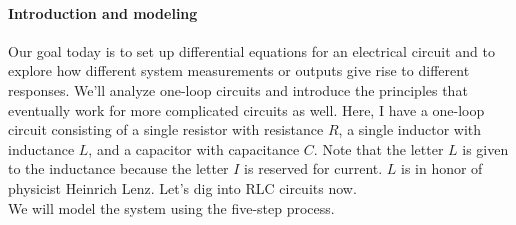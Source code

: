 \paragraph{Introduction and modeling}
Our goal today is to set up differential equations
for an electrical circuit and to explore how different system
measurements or outputs give rise to different responses.
We'll analyze one-loop circuits and introduce the principles
that eventually work for more complicated circuits as well.
Here, I have a one-loop circuit consisting
of a single resistor with resistance $R$,
a single inductor with inductance $L$,
and a capacitor with capacitance $C$.
Note that the letter $L$ is given to the inductance
because the letter $I$ is reserved for current.
$L$ is in honor of physicist Heinrich Lenz.
Let's dig into RLC circuits now.\\


We will model the system using the five-step process.

